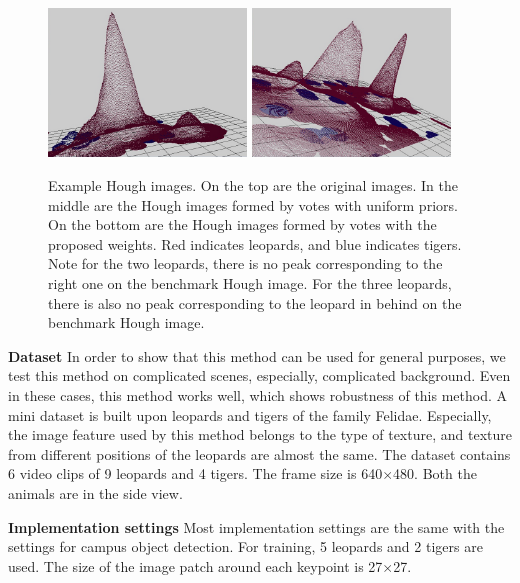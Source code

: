 \begin{figure}
\includegraphics[width=0.47\textwidth,bb=0 0 640 480]{2.jpg}
\includegraphics[width=0.47\textwidth,bb=0 0 640 480]{4.jpg}


\caption[Example Hough images]{Example Hough images. On the top are the original images. In the middle are the Hough images formed by votes with uniform priors. On the bottom are the Hough images formed by votes with the proposed weights. Red indicates leopards, and blue indicates tigers. Note for the two leopards, there is no peak corresponding to the right one on the benchmark Hough image. For the three leopards, there is also no peak corresponding to the leopard in behind on the benchmark Hough image.}
\label{fig:BcHi}
\end{figure}
\textbf{Dataset}  In order to show that this method can be used for general purposes, we test this method on complicated scenes, especially, complicated background.  Even in these cases, this method works well, which shows robustness of this method. A mini dataset is built upon leopards and tigers of the family Felidae. Especially, the image feature used by this method belongs to the type of texture, and texture from different positions of the leopards are almost the same. The dataset contains 6 video clips of 9 leopards and 4 tigers. The frame size is 640$\times$480. Both the animals are in the side view.

\textbf{Implementation settings} Most implementation settings are the same with the settings for campus object detection. For training, 5 leopards and 2 tigers are used. The size of the image patch around each keypoint is 27$\times$27.




